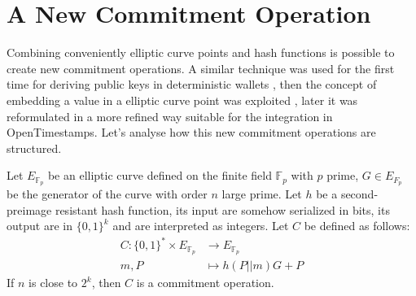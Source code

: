 \section{A New Commitment Operation}

Combining conveniently elliptic curve points and hash functions is possible to create new commitment operations.
A similar technique was used for the first time for deriving public keys in deterministic wallets \cite{Max11},
then the concept of embedding a value in a elliptic curve point was exploited \cite{journals/corr/abs-1212-3257} \cite{Sidechain},
later it was reformulated in a more refined way \cite{PoePR} \cite{PoeIs}
suitable for the integration in OpenTimestamps.
Let's analyse how this new commitment operations are structured.

\begin{myprop}
	Let $E_{\mathbb{F}_p}$ be an elliptic curve defined on the finite field $\mathbb{F}_p$ with $p$ prime, $G \in E_{F_p}$ be the generator of the curve with order $n$ large prime. Let $h$ be a second-preimage resistant hash function, its input are somehow serialized in bits, its output are in $\{0,1\}^k$ and are interpreted as integers.
	Let $C$ be defined as follows:
	\begin{equation}
	\begin{split}
	C : \{0,1\}^* \times E_{\mathbb{F}_p}  & \rightarrow E_{\mathbb{F}_p} \\
	    m, P & \mapsto h(P||m)G + P
	\end{split}
	\end{equation}
	If $n$ is close to $2^k$, then $C$ is a commitment operation.
\end{myprop}
